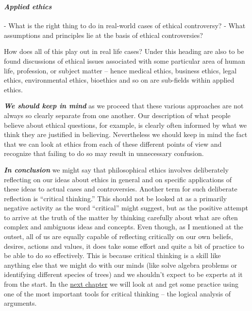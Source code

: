 \documentclass[12pt, openany]{book}
\makeatletter
\newenvironment{kframe}{%
\medskip{}
\setlength{\fboxsep}{.8em}
 \def\at@end@of@kframe{}%
 \ifinner\ifhmode%
  \def\at@end@of@kframe{\end{minipage}}%
  \begin{minipage}{\columnwidth}%
 \fi\fi%
 \def\FrameCommand##1{\hskip\@totalleftmargin \hskip-\fboxsep
 \colorbox{shadecolor}{##1}\hskip-\fboxsep
     \hskip-\linewidth \hskip-\@totalleftmargin \hskip\columnwidth}%
 \MakeFramed {\advance\hsize-\width
   \@totalleftmargin\z@ \linewidth\hsize
   \@setminipage}}%
 {\par\unskip\endMakeFramed%
 \at@end@of@kframe}
\newenvironment{rmdblock}[1]
  {
  \begin{itemize}
  \renewcommand{\labelitemi}{
    \raisebox{-.7\height}[0pt][0pt]{
      {\setkeys{Gin}{width=3em,keepaspectratio}\texttt{[image: img/\#1]}}
    }
  }
  \setlength{\fboxsep}{1em}
  \begin{kframe}
  \item
  }
  {
  \end{kframe}
  \end{itemize}
  }
\newenvironment{rmdquestion}
  {\begin{rmdblock}{question}}
  {\end{rmdblock}}
\makeatother
\begin{document}
\begin{rmdquestion}

\textbf{\emph{Applied ethics}}\\
~\\
- What is the right thing to do in real-world cases of ethical controversy? - What assumptions and principles lie at the basis of ethical controversies?

\end{rmdquestion}

How does all of this play out in real life cases? Under this heading are also to be found discussions of ethical issues associated with some particular area of human life, profession, or subject matter -- hence medical ethics, business ethics, legal ethics, environmental ethics, bioethics and so on are sub-fields within applied ethics.

\textbf{\emph{We should keep in mind}} as we proceed that these various approaches are not always so clearly separate from one another. Our description of what people believe about ethical questions, for example, is clearly often informed by what we think they are justified in believing. Nevertheless we should keep in mind the fact that we can look at ethics from each of these different points of view and recognize that failing to do so may result in unnecessary confusion.

\textbf{\emph{In conclusion}} we might say that philosophical ethics involves deliberately reflecting on our ideas about ethics in general and on specific applications of these ideas to actual cases and controversies. Another term for such deliberate reflection is ``critical thinking.'' This should not be looked at as a primarily negative activity as the word ``critical'' might suggest, but as the positive attempt to arrive at the truth of the matter by thinking carefully about what are often complex and ambiguous ideas and concepts. Even though, as I mentioned at the outset, all of us are equally capable of reflecting critically on our own beliefs, desires, actions and values, it does take some effort and quite a bit of practice to be able to do so effectively. This is because critical thinking is a skill like anything else that we might do with our minds (like solve algebra problems or identifying different species of trees) and we shouldn't expect to be experts at it from the start. In the \protect\hyperlink{logic}{next chapter} we will look at and get some practice using one of the most important tools for critical thinking -- the logical analysis of arguments.
\end{document}
